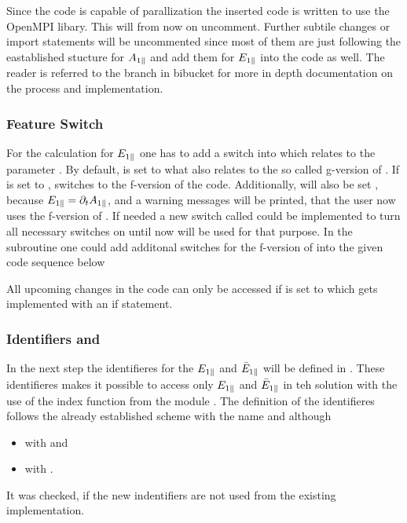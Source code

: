 \newpage

Since the code is capable of parallization the inserted code is written to use the OpenMPI libary. This will from now on uncomment. Further subtile changes or import statements will be uncommented since most of them are just following the eastablished stucture for $A_{1\parallel}$ and add them for $E_{1\parallel}$ into the code as well. The reader is referred to the branch in bibucket\cite{FeatureEparBitbucket} for more in depth documentation on the process and implementation.

\subsubsection*{Feature Switch}

For the calculation for $E_{1\parallel}$ one has to add a switch into  which relates to the parameter . By default,  is set to  what also relates to the so called g-version of \gkw. If  is set to , \gkw switches to the f-version of the code. Additionally,  will also be set , because $E_{1\parallel} = \partial_t A_{1\parallel}$, and a warning messages will be printed, that the user now uses the f-version of \gkw. If needed a new switch called  could be implemented to turn all necessary switches on until now  will be used for that purpose. In the subroutine  one could add additonal switches for the f-version of \gkw into the given code sequence below

All upcoming changes in the code can only be accessed if  is set to  which gets implemented with an if statement.

\subsubsection*{Identifiers  and }

In the next step the identifieres for the $E_{1\parallel}$ and $\bar{E}_{1\parallel}$ will be defined in . These identifieres makes it possible to access only $E_{1\parallel}$ and $\bar{E}_{1\parallel}$ in teh solution  with the use of the index function from the module . The definition of the identifieres follows the already established scheme with the name  and  although 
\begin{itemize}
    \item {} with  and
    \item {} with .
\end{itemize}
It was checked, if the new indentifiers are not used from the existing implementation. \bigskip

